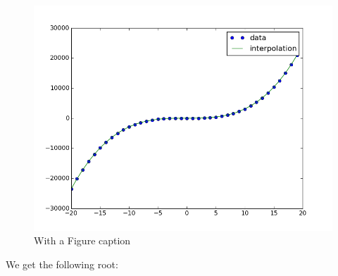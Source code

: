 \documentclass{article}
\begin{document}
\begin{figure}[!h]
\centering
\includegraphics[scale=0.5]{"../Lesson 3/interpolation_plot"}
\caption{With a Figure caption}
\label{fig:interpolation_plot}
\end{figure}

We get the following root:
\begin{pythonOutput}
[-1.2114903]
\end{pythonOutput}
\end{document}
